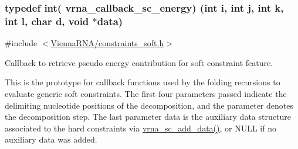 \subsubsection[{vrna\+\_\+callback\+\_\+sc\+\_\+energy}]{\setlength{\rightskip}{0pt plus 5cm}typedef int( vrna\+\_\+callback\+\_\+sc\+\_\+energy) (int i, int j, int k, int l, char d, void $\ast$data)}\label{group__soft__constraints_gaf38062858ac25fd5e240c2c3b0b0b780}


{\ttfamily \#include $<$\hyperlink{constraints__soft_8h}{Vienna\+R\+N\+A/constraints\+\_\+soft.\+h}$>$}



Callback to retrieve pseudo energy contribution for soft constraint feature. 

This is the prototype for callback functions used by the folding recursions to evaluate generic soft constraints. The first four parameters passed indicate the delimiting nucleotide positions of the decomposition, and the parameter {\ttfamily denotes} the decomposition step. The last parameter {\ttfamily data} is the auxiliary data structure associated to the hard constraints via \hyperlink{group__soft__constraints_ga15c6d52471ec97897e2bb7f964f5deb6}{vrna\+\_\+sc\+\_\+add\+\_\+data()}, or N\+U\+L\+L if no auxiliary data was added.

